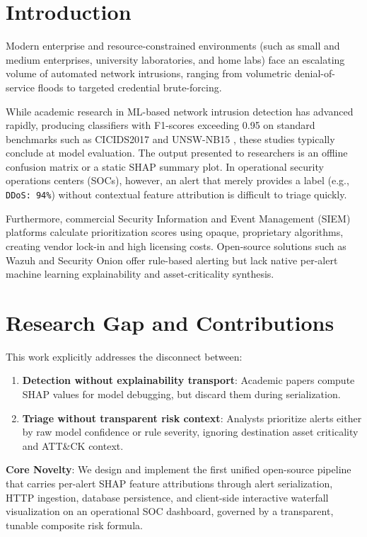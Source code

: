 \documentclass[conference]{IEEEtran}
\begin{document}
\section{Introduction}
Modern enterprise and resource-constrained environments (such as small and medium enterprises, university laboratories, and home labs) face an escalating volume of automated network intrusions, ranging from volumetric denial-of-service floods to targeted credential brute-forcing. 

While academic research in ML-based network intrusion detection has advanced rapidly, producing classifiers with F1-scores exceeding 0.95 on standard benchmarks such as CICIDS2017 \cite{sharafaldin2018toward} and UNSW-NB15 \cite{moustafa2015unsw}, these studies typically conclude at model evaluation. The output presented to researchers is an offline confusion matrix or a static SHAP summary plot. In operational security operations centers (SOCs), however, an alert that merely provides a label (e.g., \texttt{DDoS: 94\%}) without contextual feature attribution is difficult to triage quickly. 

Furthermore, commercial Security Information and Event Management (SIEM) platforms calculate prioritization scores using opaque, proprietary algorithms, creating vendor lock-in and high licensing costs. Open-source solutions such as Wazuh and Security Onion offer rule-based alerting but lack native per-alert machine learning explainability and asset-criticality synthesis.

\section{Research Gap and Contributions}
This work explicitly addresses the disconnect between:
\begin{enumerate}
    \item \textbf{Detection without explainability transport}: Academic papers compute SHAP values \cite{lundberg2020local} for model debugging, but discard them during serialization.
    \item \textbf{Triage without transparent risk context}: Analysts prioritize alerts either by raw model confidence or rule severity, ignoring destination asset criticality and ATT\&CK context.
\end{enumerate}

\textbf{Core Novelty}: We design and implement the first unified open-source pipeline that carries per-alert SHAP feature attributions through alert serialization, HTTP ingestion, database persistence, and client-side interactive waterfall visualization on an operational SOC dashboard, governed by a transparent, tunable composite risk formula.
\end{document}
